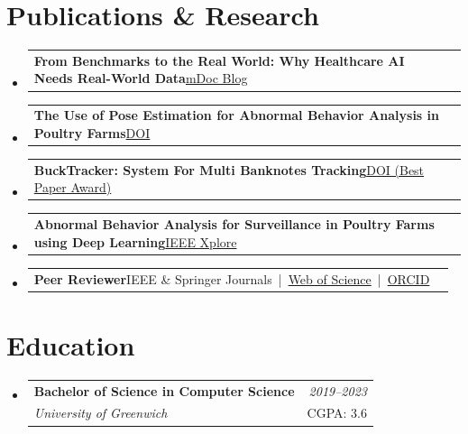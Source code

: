 \documentclass[a4paper,11pt]{article}
\makeatletter
\newcommand{\resumePOR}[3]{
\vspace{0.5mm}\item
    \begin{tabular*}{0.97\textwidth}[t]{l@{\extracolsep{\fill}}r}
        \textbf{#1}\hspace{0.3mm}#2 & \textit{\small{#3}}
    \end{tabular*}
    \vspace{-2mm}
}
\newcommand{\resumeSubheading}[4]{
\vspace{0.5mm}\item
    \begin{tabular*}{0.98\textwidth}[t]{l@{\extracolsep{\fill}}r}
        \textbf{#1} & \textit{\footnotesize{#4}} \\
        \textit{\footnotesize{#3}} &  \footnotesize{#2}\\
    \end{tabular*}
    \vspace{-2.4mm}
}
\newcommand{\resumeSubHeadingListStart}{\begin{itemize}[leftmargin=*,labelsep=0mm]}
\newcommand{\resumeSubHeadingListEnd}{\end{itemize}\vspace{2mm}}
\makeatother
\begin{document}
\section{\textbf{Publications \& Research}}
\vspace{-0.4mm}
\resumeSubHeadingListStart

\resumePOR
  {From Benchmarks to the Real World: Why Healthcare AI Needs Real-World Data}
  {\href{https://mymdoc.com/blogs/from-benchmarks-to-the-real-world-why-healthcare-ai-needs-real-world-data-20250901155902082-be54471b-b841-4a35-81fc-7af13a88ae07}{mDoc Blog}}
  {}

\resumePOR
  {The Use of Pose Estimation for Abnormal Behavior Analysis in Poultry Farms}
  {\href{https://doi.org/10.1109/NILES59815.2023.10296704}{DOI}}
  {}

\resumePOR
  {BuckTracker: System For Multi Banknotes Tracking}
  {\href{https://doi.org/10.1109/IMSA58542.2023.10217421}{DOI (Best Paper Award)}}
  {}

\resumePOR
  {Abnormal Behavior Analysis for Surveillance in Poultry Farms using Deep Learning}
  {\href{https://ieeexplore.ieee.org/document/10217676}{IEEE Xplore}}
  {}

\resumePOR
  {Peer Reviewer}
  {IEEE \& Springer Journals \,|\, \href{https://www.webofscience.com/wos/author/record/LEM-7086-2024}{Web of Science} \,|\, \href{https://orcid.org/0009-0004-7610-3097}{ORCID}}
  {}

\resumeSubHeadingListEnd
\vspace{-5mm}

\section{\textbf{Education}}
\resumeSubHeadingListStart
  \resumeSubheading
    {Bachelor of Science in Computer Science}{CGPA: 3.6}
    {University of Greenwich}{2019--2023}
\resumeSubHeadingListEnd
\vspace{-5.5mm}
\end{document}
